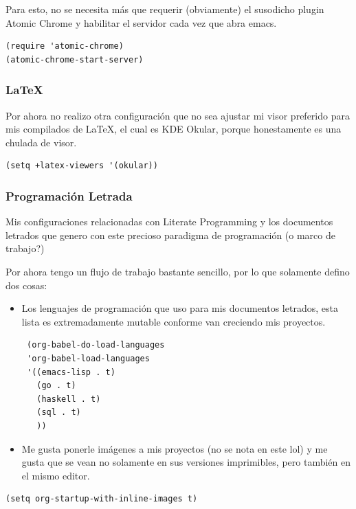 \documentclass[11pt]{article}
\begin{document}
Para esto, no se necesita más que requerir (obviamente) el susodicho plugin Atomic Chrome y habilitar el servidor cada vez que abra emacs.

\begin{verbatim}
(require 'atomic-chrome)
(atomic-chrome-start-server)
\end{verbatim}
\subsubsection{\LaTeX{}}
\label{sec:org71cf722}

Por ahora no realizo otra configuración que no sea ajustar mi visor preferido para mis compilados de \LaTeX{}, el cual es KDE Okular, porque honestamente es una chulada de visor.

\begin{verbatim}
(setq +latex-viewers '(okular))
\end{verbatim}
\subsubsection{Programación Letrada}
\label{sec:orga224d4f}

Mis configuraciones relacionadas con Literate Programming y los documentos letrados que genero con este precioso paradigma de programación (o marco de trabajo?)

Por ahora tengo un flujo de trabajo bastante sencillo, por lo que solamente defino dos cosas:

\begin{itemize}
\item Los lenguajes de programación que uso para mis documentos letrados, esta lista es extremadamente mutable conforme van creciendo mis proyectos.

\begin{verbatim}
 (org-babel-do-load-languages
 'org-babel-load-languages
 '((emacs-lisp . t)
   (go . t)
   (haskell . t)
   (sql . t)
   ))
\end{verbatim}

\item Me gusta ponerle imágenes a mis proyectos (no se nota en este lol) y me gusta que se vean no solamente en sus versiones imprimibles, pero también en el mismo editor.
\end{itemize}

\begin{verbatim}
(setq org-startup-with-inline-images t)
\end{verbatim}
\end{document}
